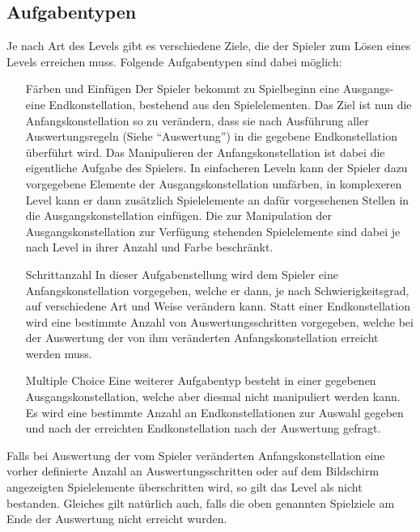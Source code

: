 \subsection{Aufgabentypen}
Je nach Art des Levels gibt es verschiedene Ziele, die der Spieler zum Lösen eines Levels erreichen muss.
Folgende Aufgabentypen sind dabei möglich:
        \begin{itemize}
                \item[Färben und Einfügen] Der Spieler bekommt zu Spielbeginn eine Ausgangs- eine Endkonstellation, bestehend aus den Spielelementen.
                Das Ziel ist nun die Anfangskonstellation so zu verändern, dass sie nach Ausführung aller Auswertungsregeln (Siehe "`Auswertung"') in die gegebene Endkonstellation überführt wird.
                Das Manipulieren der Anfangskonstellation ist dabei die eigentliche Aufgabe des Spielers.
                In einfacheren Leveln kann der Spieler dazu vorgegebene Elemente der Ausgangskonstellation umfärben, in komplexeren Level kann er dann zusätzlich Spielelemente an dafür vorgesehenen Stellen in die Ausgangskonstellation einfügen. 
                Die zur Manipulation der Ausgangskonstellation zur Verfügung stehenden Spielelemente sind dabei je nach Level in ihrer Anzahl und Farbe beschränkt.

                \item[Schrittanzahl] In dieser Aufgabenstellung wird dem Spieler eine Anfangskonstellation vorgegeben, welche er dann, je nach Schwierigkeitsgrad, auf verschiedene Art und Weise verändern kann.
                Statt einer Endkonstellation wird eine bestimmte Anzahl von Auswertungsschritten vorgegeben, welche bei der Auswertung der von ihm veränderten Anfangskonstellation erreicht werden muss.

                \item[Multiple Choice] Eine weiterer Aufgabentyp besteht in einer gegebenen Ausgangskonstellation, welche aber diesmal nicht manipuliert werden kann. 
                Es wird eine bestimmte Anzahl an Endkonstellationen zur Auswahl gegeben und nach der erreichten Endkonstellation nach der Auswertung gefragt.

        \end{itemize}

        Falls bei Auswertung der vom Spieler veränderten Anfangskonstellation eine vorher definierte Anzahl an Auswertungsschritten oder auf dem Bildschirm angezeigten Spielelemente überschritten wird, so gilt das Level als nicht bestanden. 
        Gleiches gilt natürlich auch, falls die oben genannten Spielziele am Ende der Auswertung nicht erreicht wurden.
        

